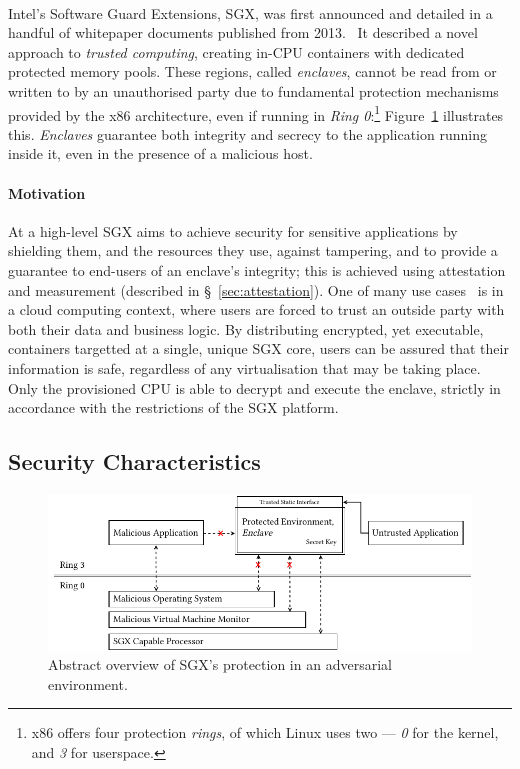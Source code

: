 \paragraph{} Intel's Software Guard Extensions, SGX, was first announced and detailed in a handful of whitepaper documents published from 2013.~\cite{10.1145/2487726.2488370, 10.1145/2487726.2488368, Anati2013InnovativeTF, sgx-sgx-reference} It described a novel approach to \textit{trusted computing}, creating in-CPU containers with dedicated protected memory pools. These regions, called \textit{enclaves}, cannot be read from or written to by an unauthorised party due to fundamental protection mechanisms provided by the x86 architecture, even if running in \textit{Ring 0}:\footnote{x86 offers four protection \textit{rings}, of which Linux uses two --- \textit{0} for the kernel, and \textit{3} for userspace.} Figure~\ref{fig:sgx-basic} illustrates this. \textit{Enclaves} guarantee both integrity and secrecy to the application running inside it, even in the presence of a malicious host.

\paragraph{Motivation} At a high-level SGX aims to achieve security for sensitive applications by shielding them, and the resources they use, against tampering, and to provide a guarantee to end-users of an enclave's integrity; this is achieved using attestation and measurement (described in §~\ref{sec:attestation}). One of many use cases~\cite{10.1145/2834050.2834100, 10.1145/2799647, 10.1145/2810103.2813695} is in a cloud computing context, where users are forced to trust an outside party with both their data and business logic. By distributing encrypted, yet executable, containers targetted at a single, unique SGX core, users can be assured that their information is safe, regardless of any virtualisation that may be taking place. Only the provisioned CPU is able to decrypt and execute the enclave, strictly in accordance with the restrictions of the SGX platform.

\subsection{Security Characteristics}

\begin{figure}[]
    \centering
    \includegraphics[width=0.95\linewidth]{figures/SGX-architecture.pdf}
    \caption{Abstract overview of SGX's protection in an adversarial environment.}
    \label{fig:sgx-basic}
\end{figure}

